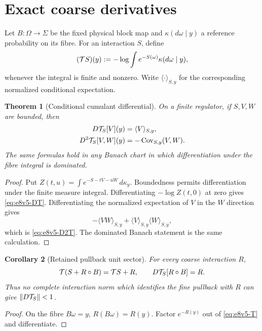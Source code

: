 \documentclass[11pt,oneside]{book}
\newtheorem{theorem}{Theorem}[chapter]
\newtheorem{corollary}[theorem]{Corollary}
\theoremstyle{definition}
\theoremstyle{remark}
\begin{document}
\section{Exact coarse derivatives}
\label{sec:e8v5-derivatives}

Let \(B:\Omega\to\Sigma\) be the fixed physical block map and
\(\kappa(d\omega\mid y)\) a reference probability on its fibre.  For
an interaction \(S\), define
\[
 ({\cal T}S)(y)
 :=-\log\int e^{-S(\omega)}\kappa(d\omega\mid y),     \label{eq:e8v5-T}
\]
whenever the integral is finite and nonzero.  Write
\(\langle\cdot\rangle_{S,y}\) for the corresponding normalized
conditional expectation.

\begin{theorem}[Conditional cumulant differential]
\label{thm:e8v5-cumulant}
On a finite regulator, if \(S,V,W\) are bounded, then
\begin{align}
 D{\cal T}_S[V](y)
 &=\langle V\rangle_{S,y},                            \label{eq:e8v5-DT}\\
 D^2{\cal T}_S[V,W](y)
 &=-\operatorname{Cov}_{S,y}(V,W).                   \label{eq:e8v5-D2T}
\end{align}
The same formulas hold in any Banach chart in which differentiation
under the fibre integral is dominated.
\end{theorem}

\begin{proof}
Put \(Z(t,u)=\int e^{-S-tV-uW}\,d\kappa_y\).
Boundedness permits differentiation under the finite measure
integral.  Differentiating \(-\log Z(t,0)\) at zero gives
\eqref{eq:e8v5-DT}.  Differentiating the normalized expectation of
\(V\) in the \(W\) direction gives
\[
 -\langle VW\rangle_{S,y}
 +\langle V\rangle_{S,y}\langle W\rangle_{S,y},
\]
which is \eqref{eq:e8v5-D2T}.  The dominated Banach statement is the
same calculation.
\end{proof}

\begin{corollary}[Retained pullback unit sector]
\label{cor:e8v5-pullback}
For every coarse interaction \(R\),
\[
 {\cal T}(S+R\circ B)={\cal T}S+R,
 \qquad D{\cal T}_S[R\circ B]=R.                     \label{eq:e8v5-pullback}
\]
Thus no complete interaction norm which identifies the fine pullback
with \(R\) can give \(\|D{\cal T}_S\|<1\).
\end{corollary}

\begin{proof}
On the fibre \(B\omega=y\), \(R(B\omega)=R(y)\).  Factor
\(e^{-R(y)}\) out of \eqref{eq:e8v5-T} and differentiate.
\end{proof}
\end{document}
